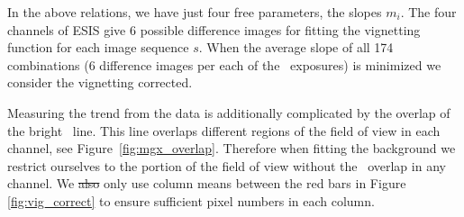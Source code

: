 In the above relations, we have just four free parameters, the slopes $m_i$. 
The four channels of ESIS give 6 possible difference images for fitting the vignetting function for each image sequence $s$.
When the average slope of all 174 combinations (6 difference images per each of the \numDataFrames \ exposures) is minimized we consider the vignetting corrected.

Measuring the trend from the data is additionally complicated by the overlap of the bright \mgxbright \ line.  
This line overlaps different regions of the field of view in each channel, see Figure~\ref{fig:mgx_overlap}.  
Therefore when fitting the background we restrict ourselves to the portion of the field of view without the \mgxbright \ overlap in any channel.
We \sout{also} only use column means between the red bars in Figure \ref{fig:vig_correct} to ensure sufficient pixel numbers in each column.  


